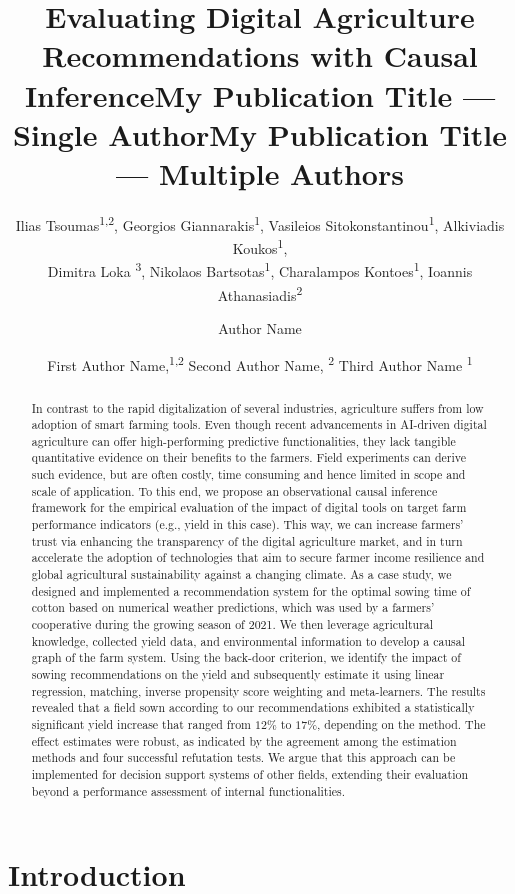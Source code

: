 \documentclass[letterpaper]{article} %
\title{Evaluating Digital Agriculture Recommendations with Causal Inference}
\author{
Ilias Tsoumas\equalcontrib\textsuperscript{\rm 1,2},
Georgios Giannarakis\equalcontrib\textsuperscript{\rm 1},
Vasileios Sitokonstantinou\textsuperscript{\rm 1},
Alkiviadis Koukos\textsuperscript{\rm 1},\\
Dimitra Loka \textsuperscript{\rm 3},
Nikolaos Bartsotas\textsuperscript{\rm 1},
Charalampos Kontoes\textsuperscript{\rm 1},
Ioannis Athanasiadis\textsuperscript{\rm 2}
}
\title{My Publication Title --- Single Author}
\author {
Author Name
}
\title{My Publication Title --- Multiple Authors}
\author {
First Author Name,\textsuperscript{\rm 1,\rm 2}
Second Author Name, \textsuperscript{\rm 2}
Third Author Name \textsuperscript{\rm 1}
}
\begin{document}
\maketitle

\begin{abstract}
In contrast to the rapid digitalization of several industries, agriculture suffers from low adoption of smart farming tools. Even though recent advancements in AI-driven digital agriculture can offer high-performing predictive functionalities, they lack tangible quantitative evidence on their benefits to the farmers. Field experiments can derive such evidence, but are often costly, time consuming and hence limited in scope and scale of application.
To this end, we propose an observational causal inference framework
for the empirical evaluation of the impact of digital tools on target farm performance indicators (e.g., yield in this case). This way, we can increase farmers' trust via enhancing the transparency of the digital agriculture market, and in turn accelerate the adoption of technologies that aim to secure farmer income resilience and global agricultural sustainability against a changing climate.
As a case study, we designed and implemented a recommendation system for the optimal sowing time of cotton based on numerical weather predictions, which was used by a farmers' cooperative during the growing season of 2021. We then leverage agricultural knowledge, collected yield data, and environmental information to develop a causal graph of the farm system. Using the back-door criterion, we identify the impact of sowing recommendations on the yield and subsequently estimate it using linear regression, matching, inverse propensity score weighting and meta-learners.
The results revealed that a field sown according to our recommendations exhibited a statistically significant yield increase that ranged from $12\%$ to $17\%$, depending on the method. The effect estimates were robust, as indicated by the agreement among the estimation methods and four successful refutation tests. We argue that this approach can be implemented for decision support systems of other fields, extending their evaluation beyond a performance assessment of internal functionalities.
\end{abstract}

\section{Introduction}
\end{document}
